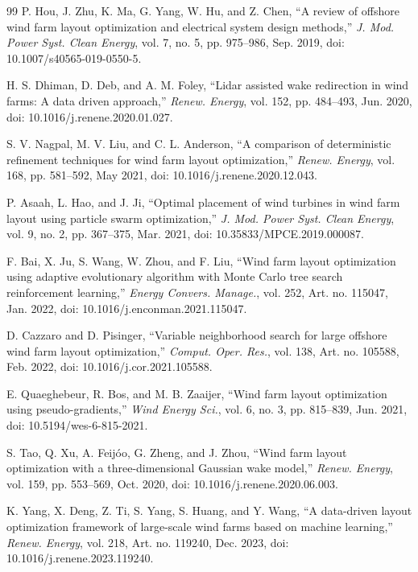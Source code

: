 \documentclass[journal,twoside]{IEEEtran}
\begin{document}
\begin{thebibliography}{99}
P. Hou, J. Zhu, K. Ma, G. Yang, W. Hu, and Z. Chen, ``A review of offshore wind farm layout optimization and electrical system design methods,'' \textit{J. Mod. Power Syst. Clean Energy}, vol. 7, no. 5, pp. 975--986, Sep. 2019, doi: 10.1007/s40565-019-0550-5.

H. S. Dhiman, D. Deb, and A. M. Foley, ``Lidar assisted wake redirection in wind farms: A data driven approach,'' \textit{Renew. Energy}, vol. 152, pp. 484--493, Jun. 2020, doi: 10.1016/j.renene.2020.01.027.

S. V. Nagpal, M. V. Liu, and C. L. Anderson, ``A comparison of deterministic refinement techniques for wind farm layout optimization,'' \textit{Renew. Energy}, vol. 168, pp. 581--592, May 2021, doi: 10.1016/j.renene.2020.12.043.

P. Asaah, L. Hao, and J. Ji, ``Optimal placement of wind turbines in wind farm layout using particle swarm optimization,'' \textit{J. Mod. Power Syst. Clean Energy}, vol. 9, no. 2, pp. 367--375, Mar. 2021, doi: 10.35833/MPCE.2019.000087.

F. Bai, X. Ju, S. Wang, W. Zhou, and F. Liu, ``Wind farm layout optimization using adaptive evolutionary algorithm with Monte Carlo tree search reinforcement learning,'' \textit{Energy Convers. Manage.}, vol. 252, Art. no. 115047, Jan. 2022, doi: 10.1016/j.enconman.2021.115047.

D. Cazzaro and D. Pisinger, ``Variable neighborhood search for large offshore wind farm layout optimization,'' \textit{Comput. Oper. Res.}, vol. 138, Art. no. 105588, Feb. 2022, doi: 10.1016/j.cor.2021.105588.

E. Quaeghebeur, R. Bos, and M. B. Zaaijer, ``Wind farm layout optimization using pseudo-gradients,'' \textit{Wind Energy Sci.}, vol. 6, no. 3, pp. 815--839, Jun. 2021, doi: 10.5194/wes-6-815-2021.

S. Tao, Q. Xu, A. Feij\'oo, G. Zheng, and J. Zhou, ``Wind farm layout optimization with a three-dimensional Gaussian wake model,'' \textit{Renew. Energy}, vol. 159, pp. 553--569, Oct. 2020, doi: 10.1016/j.renene.2020.06.003.

K. Yang, X. Deng, Z. Ti, S. Yang, S. Huang, and Y. Wang, ``A data-driven layout optimization framework of large-scale wind farms based on machine learning,'' \textit{Renew. Energy}, vol. 218, Art. no. 119240, Dec. 2023, doi: 10.1016/j.renene.2023.119240.


\end{thebibliography}
\end{document}
